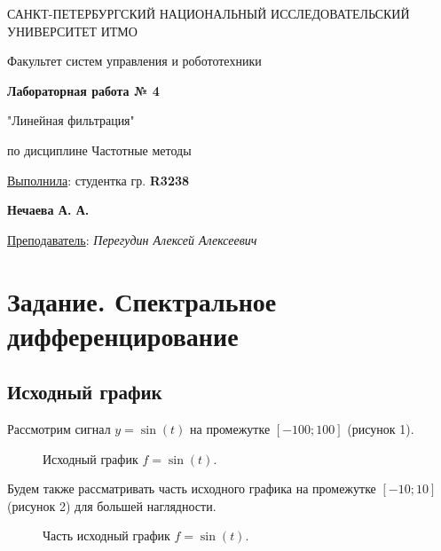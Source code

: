 \documentclass[a5paper, 10pt]{article}
\theoremstyle{definition}
\theoremstyle{plain}
\theoremstyle{remark}
\newcommand*{\titlePage}{
	\thispagestyle{title}
	\begingroup
	\begin{center}
		\vspace*{6ex}
		
		{\small
			САНКТ-ПЕТЕРБУРГСКИЙ НАЦИОНАЛЬНЫЙ ИССЛЕДОВАТЕЛЬСКИЙ УНИВЕРСИТЕТ ИТМО	
		}
		
		\vspace*{2ex}
		
		{\normalsize
			Факультет систем управления и робототехники
		}
		
		\vspace*{15ex}
		
		{\Large \bfseries 
			Лабораторная работа № 4
		}
\vspace*{2ex}
	{\Large \bfseries 
			
"Линейная фильтрация"
		}
\vspace*{2ex}
		
		{\normalsize
			по дисциплине Частотные методы
		}

	\end{center}
	\vspace*{20ex}
	\begin{flushright}
		{\large 
			\underline{Выполнила}: студентка гр. \textbf{R3238}\\
			\begin{flushright}
				\textbf{Нечаева А. А.}\\
			\end{flushright}
		}
		
		\vspace*{5ex}
		
		{\large 
			\underline{Преподаватель}: \textit{Перегудин Алексей Алексеевич}
		}
	\end{flushright}	
	\newpage
	\setcounter{page}{1}
	\endgroup}
\begin{document}
	\titlePage
	\pagestyle{style}
\newpage


\section{Задание. Спектральное дифференцирование}
 \subsection{Исходный график}
Рассмотрим сигнал $y=\sin (t)$ на промежутке $[-100; 100]$ (рисунок 1).

\begin{figure}[h!]
\caption{Исходный график $f= \sin(t)$.}
\end{figure}

Будем также рассматривать часть исходного графика на промежутке $[-10; 10]$ (рисунок 2) для большей наглядности.

\begin{figure}[h!]
\caption{Часть исходный график $f= \sin(t)$.}
\end{figure}
\end{document}

